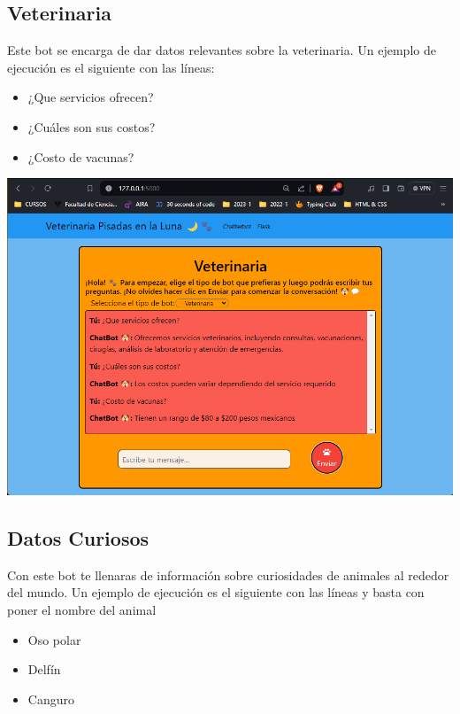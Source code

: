 \subsection{Veterinaria}

Este bot se encarga de dar datos relevantes sobre la veterinaria. Un ejemplo de ejecución es el siguiente con las líneas:

\begin{itemize}
    \item ¿Que servicios ofrecen?
    \item ¿Cuáles son sus costos?
    \item ¿Costo de vacunas?
\end{itemize}

\begin{center}
    \includegraphics[scale = .5]{IMA/veterinaria.png}
\end{center}


\subsection{Datos Curiosos}

Con este bot te llenaras de información 
sobre curiosidades de animales al rededor 
del mundo. Un ejemplo de ejecución es 
el siguiente con las líneas y basta con 
poner el nombre del animal

\begin{itemize}    
    \item Oso polar
    \item Delfín
    \item Canguro
\end{itemize}

